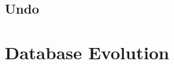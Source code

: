 \documentclass[english,submission]{programming}
\theoremstyle{definition}
\begin{document}
\subsection{Undo}







\section{Database Evolution}\label{db-evolution}
\end{document}
